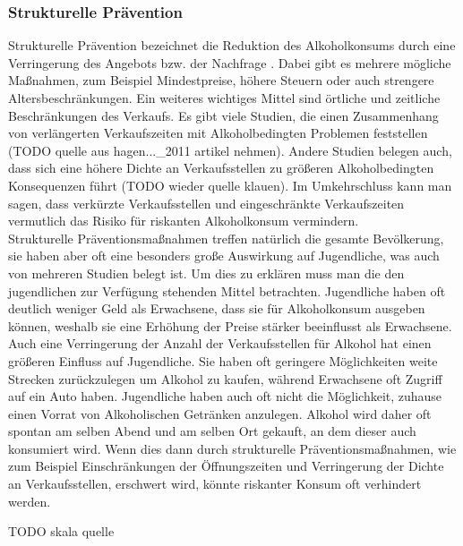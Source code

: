 \documentclass[12pt]{article}
\begin{document}
\subsubsection{Strukturelle Prävention}
Strukturelle Prävention bezeichnet die Reduktion des Alkoholkonsums durch eine Verringerung des Angebots bzw. der Nachfrage \autocite{skala_jugend_2020} \autocite{hagen_verkaufseinschrankungen_2011}. Dabei gibt es mehrere mögliche Maßnahmen, zum Beispiel Mindestpreise, höhere Steuern oder auch strengere Altersbeschränkungen. Ein weiteres wichtiges Mittel sind örtliche und zeitliche Beschränkungen des Verkaufs. Es gibt viele Studien, die einen Zusammenhang von verlängerten Verkaufszeiten mit Alkoholbedingten Problemen feststellen (TODO quelle aus hagen..._2011 artikel nehmen). Andere Studien belegen auch, dass sich eine höhere Dichte an Verkaufsstellen zu größeren Alkoholbedingten Konsequenzen führt (TODO wieder quelle klauen). Im Umkehrschluss kann man sagen, dass verkürzte Verkaufsstellen und eingeschränkte Verkaufszeiten vermutlich das Risiko für riskanten Alkoholkonsum vermindern.\\
Strukturelle Präventionsmaßnahmen treffen natürlich die gesamte Bevölkerung, sie haben aber oft eine besonders große Auswirkung auf Jugendliche, was auch von mehreren Studien belegt ist. Um dies zu erklären muss man die den jugendlichen zur Verfügung stehenden Mittel betrachten. Jugendliche haben oft deutlich weniger Geld als Erwachsene, dass sie für Alkoholkonsum ausgeben können, weshalb sie eine Erhöhung der Preise stärker beeinflusst als Erwachsene. Auch eine Verringerung der Anzahl der Verkaufsstellen für Alkohol hat einen größeren Einfluss auf Jugendliche. Sie haben oft geringere Möglichkeiten weite Strecken zurückzulegen um Alkohol zu kaufen, während Erwachsene oft Zugriff auf ein Auto haben. Jugendliche haben auch oft nicht die Möglichkeit, zuhause einen Vorrat von Alkoholischen Getränken anzulegen. Alkohol wird daher oft spontan am selben Abend und am selben Ort gekauft, an dem dieser auch konsumiert wird. Wenn dies dann durch strukturelle Präventionsmaßnahmen, wie zum Beispiel Einschränkungen der Öffnungszeiten und Verringerung der Dichte an Verkaufsstellen, erschwert wird, könnte riskanter Konsum oft verhindert werden.

TODO skala quelle
\end{document}
